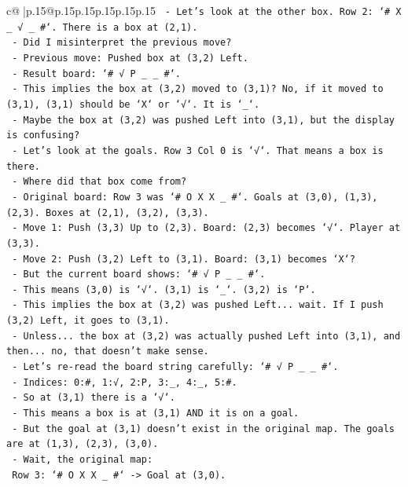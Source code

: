 \documentclass{article}
\begin{document}
{\begin{supertabular}{c@{$\;$}|p{.15\linewidth}@{}p{.15\linewidth}p{.15\linewidth}p{.15\linewidth}p{.15\linewidth}p{.15\linewidth}}
{{{\texttt{  {-} Let's look at the other box. Row 2: `\# X \_ √ \_ \#`. There is a box at (2,1).} \\
\texttt{  {-} Did I misinterpret the previous move?} \\
\texttt{  {-} Previous move: Pushed box at (3,2) Left.} \\
\texttt{  {-} Result board: `\# √ P \_ \_ \#`.} \\
\texttt{  {-} This implies the box at (3,2) moved to (3,1)? No, if it moved to (3,1), (3,1) should be `X` or `√`. It is `\_`.} \\
\texttt{  {-} Maybe the box at (3,2) was pushed Left into (3,1), but the display is confusing?} \\
\texttt{  {-} Let's look at the goals. Row 3 Col 0 is `√`. That means a box is there.} \\
\texttt{  {-} Where did that box come from?} \\
\texttt{  {-} Original board: Row 3 was `\# O X X \_ \#`. Goals at (3,0), (1,3), (2,3). Boxes at (2,1), (3,2), (3,3).} \\
\texttt{  {-} Move 1: Push (3,3) Up to (2,3). Board: (2,3) becomes `√`. Player at (3,3).} \\
\texttt{  {-} Move 2: Push (3,2) Left to (3,1). Board: (3,1) becomes `X`?} \\
\texttt{  {-} But the current board shows: `\# √ P \_ \_ \#`.} \\
\texttt{  {-} This means (3,0) is `√`. (3,1) is `\_`. (3,2) is `P`.} \\
\texttt{  {-} This implies the box at (3,2) was pushed Left... wait. If I push (3,2) Left, it goes to (3,1).} \\
\texttt{  {-} Unless... the box at (3,2) was actually pushed Left into (3,1), and then... no, that doesn't make sense.} \\
\texttt{  {-} Let's re{-}read the board string carefully: `\# √ P \_ \_ \#`.} \\
\texttt{  {-} Indices: 0:\#, 1:√, 2:P, 3:\_, 4:\_, 5:\#.} \\
\texttt{  {-} So at (3,1) there is a `√`.} \\
\texttt{  {-} This means a box is at (3,1) AND it is on a goal.} \\
\texttt{  {-} But the goal at (3,1) doesn't exist in the original map. The goals are at (1,3), (2,3), (3,0).} \\
\texttt{  {-} Wait, the original map:} \\
\texttt{    Row 3: `\# O X X \_ \#` {-}> Goal at (3,0).} \\
}}}
\end{supertabular}}
\end{document}
